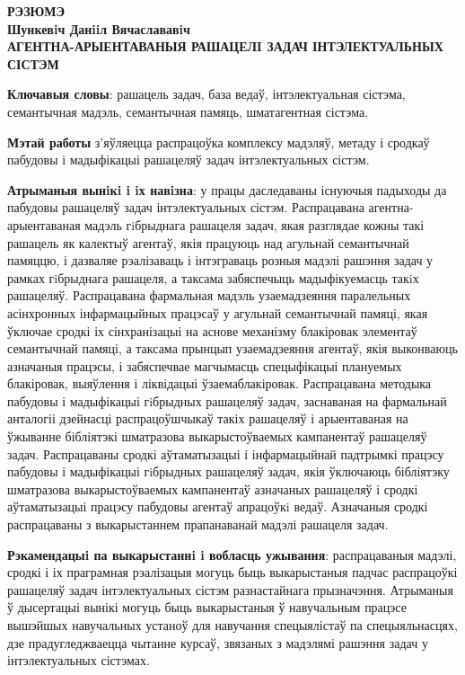 \documentclass{thesisby}
\begin{document}
\newpage
\begin{center}
\bf РЭЗЮМЭ\\[1mm]\rm Шункевiч Данiiл Вячаслававiч\\[1mm] \bf
АГЕНТНА-АРЫЕНТАВАНЫЯ РАШАЦЕЛI ЗАДАЧ ІНТЭЛЕКТУАЛЬНЫХ СІСТЭМ
\end{center}

{\bf Ключавыя словы}: рашацель задач, база веда\u{у}, інтэлектуальная сістэма, семантычная мадэль, семантычная памяць, шматагентная сістэма.

\textbf{Мэтай работы} з'яўляецца распрацоўка комплексу мадэляў, метаду і сродкаў пабудовы і мадыфікацыі рашацеляў задач інтэлектуальных сістэм.

\textbf{Атрыманыя вынiкi i iх навiзна}:
у працы даследаваны існуючыя падыходы да пабудовы рашацеляў задач інтэлектуальных сістэм. Распрацавана агентна-арыентаваная мадэль гiбрыднага рашацеля задач, якая разглядае кожны такі рашацель як калектыў агентаў, якія працуюць над агульнай семантычнай памяццю, і дазваляе рэалізаваць і інтэграваць розныя мадэлі рашэння задач у рамках гiбрыднага рашацеля, а таксама забяспечыць мадыфікуемасць такiх рашацеляў. Распрацавана фармальная мадэль узаемадзеяння паралельных асінхронных інфармацыйных працэсаў у агульнай семантычнай памяці, якая ўключае сродкі іх сінхранізацыі на аснове механізму блакіровак элементаў семантычнай памяці, а таксама прынцып узаемадзеяння агентаў, якія выконваюць азначаныя працэсы, і забяспечвае магчымасць спецыфікацыі плануемых блакіровак, выяўлення і ліквідацыі ўзаемаблакіровак. Распрацавана методыка пабудовы і мадыфікацыі гiбрыдных рашацеляў задач, заснаваная на фармальнай анталогіі дзейнасці распрацоўшчыкаў такіх рашацеляў і арыентаваная на ўжыванне бібліятэкі шматразова выкарыстоўваемых кампанентаў рашацеляў задач. Распрацаваны сродкі аўтаматызацыі і інфармацыйнай падтрымкі працэсу пабудовы і мадыфікацыі гiбрыдных рашацеляў задач, якія ўключаюць бібліятэку шматразова выкарыстоўваемых кампанентаў азначаных рашацеляў і сродкі аўтаматызацыі працэсу пабудовы агентаў апрацоўкi ведаў. Азначаныя сродкі распрацаваны з выкарыстаннем прапанаванай мадэлі рашацеля задач.

\textbf{Рэкамендацыi па выкарыстаннi i вобласць ужывання}:
распрацаваныя мадэлі, сродкі і іх праграмная рэалізацыя могуць быць выкарыстаныя падчас распрацоўкі рашацеляў задач інтэлектуальных сістэм разнастайнага прызначэння. Атрыманыя ў дысертацыі вынікі могуць быць выкарыстаныя ў навучальным працэсе вышэйшых навучальных устаноў для навучання спецыялістаў па спецыяльнасцях, дзе прадугледжваецца чытанне курсаў, звязаных з мадэлямі рашэння задач у інтэлектуальных сістэмах.
\end{document}
